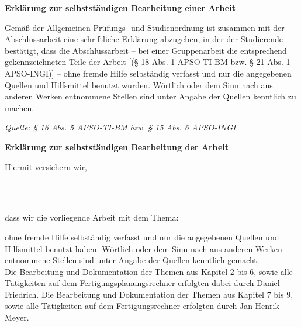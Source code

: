 \clearpage
\thispagestyle{plain}
\textbf{\sffamily\large Erklärung zur selbstständigen Bearbeitung einer Arbeit}

{\footnotesize
Gemäß der Allgemeinen Prüfungs- und Studienordnung ist zusammen mit der Abschlussarbeit eine schriftliche Erklärung abzugeben, in der der Studierende bestätigt, dass die Abschlussarbeit \glqq– bei einer Gruppenarbeit die entsprechend gekennzeichneten Teile der Arbeit [(§ 18 Abs. 1 APSO-TI-BM bzw. § 21 Abs. 1 APSO-INGI)] – ohne fremde Hilfe selbständig verfasst und nur die angegebenen Quellen und Hilfsmittel benutzt wurden. Wörtlich oder dem Sinn nach aus anderen Werken entnommene Stellen sind unter Angabe der Quellen kenntlich zu machen.\grqq
}

\hfill {\em\footnotesize Quelle: § 16 Abs. 5 APSO-TI-BM bzw. § 15 Abs. 6 APSO-INGI}

\vspace{1cm}
\textbf{\sffamily Erklärung zur selbstständigen Bearbeitung der Arbeit}

Hiermit versichern wir,\\

\par\noindent{}    \makebox[8cm]{\hrulefill}
\par\noindent{} \makebox[8cm]{\hrulefill}\\

\par\noindent{}    \makebox[8cm]{\hrulefill}
\par\noindent{} \makebox[8cm]{\hrulefill}\\

dass wir die vorliegende Arbeit mit dem Thema:

\textbf{\IthesisTitle}

ohne fremde Hilfe selbständig verfasst und nur die angegebenen Quellen und Hilfsmittel benutzt haben.
Wörtlich oder dem Sinn nach aus anderen Werken entnommene Stellen sind unter Angabe der Quellen kenntlich gemacht.\\

Die Bearbeitung und Dokumentation der Themen aus Kapitel 2 bis 6, sowie alle Tätigkeiten auf dem Fertigungsplanungsrechner erfolgten dabei durch Daniel Friedrich.
Die Bearbeitung und Dokumentation der Themen aus Kapitel 7 bis 9, sowie alle Tätigkeiten auf dem Fertigungsrechner erfolgten durch Jan-Henrik Meyer.

